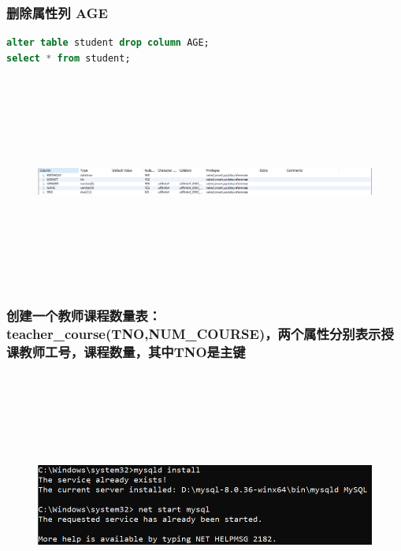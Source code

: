 \documentclass{ctexart}
\begin{document}
\subsubsection{删除属性列 AGE}
\begin{lstlisting}[language=sql]
alter table student drop column AGE;  
select * from student;
\end{lstlisting}
\begin{figure}[H]
	\centering 
	\includegraphics[height=7cm,width=14cm]{10.png}
	\end{figure}
\subsubsection{创建一个教师课程数量表：teacher\_course(TNO,NUM\_COURSE)，两个属性分别表示授课教师工号，课程数量，其中TNO是主键}
\begin{lstlisting}[language=sql]
	
\end{lstlisting}
\begin{figure}[H]
	\centering 
	\includegraphics[height=7cm,width=14cm]{1.png}
	\end{figure}
\end{document}
